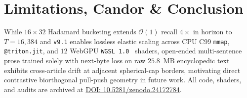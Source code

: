 \documentclass[10pt,twocolumn]{article}
\begin{document}
\section{Limitations, Candor \& Conclusion}
While $16\times 32$ Hadamard bucketing extends $\mathcal{O}(1)$ recall $4\times$ in horizon to $T=16{,}384$ and \texttt{v9.1} enables lossless elastic scaling across CPU C99 \texttt{mmap}, \texttt{@triton.jit}, and $12$ WebGPU \texttt{WGSL 1.0}~\citep{w3c2024webgpu} shaders, open-ended multi-sentence prose trained solely with next-byte loss on raw $25.8$~MB encyclopedic text exhibits cross-article drift at adjacent spherical-cap borders, motivating direct contrastive biorthogonal pull-push geometry in future work. All code, shaders, and audits are archived at \href{https://doi.org/10.5281/zenodo.24172784}{DOI: 10.5281/zenodo.24172784}.



\end{document}
